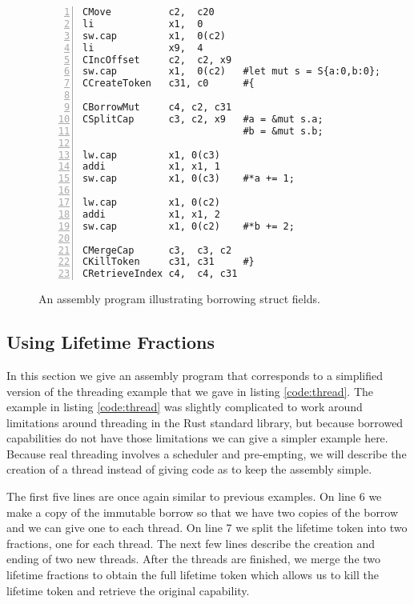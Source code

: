\begin{figure}[h]
\begin{lstlisting}[style=custASM, numbers = left ,xleftmargin=1.5em]
CMove          c2,  c20
li             x1,  0
sw.cap         x1,  0(c2)
li             x9,  4
CIncOffset     c2,  c2, x9
sw.cap         x1,  0(c2)   #let mut s = S{a:0,b:0};
CCreateToken   c31, c0      #{

CBorrowMut     c4, c2, c31
CSplitCap      c3, c2, x9   #a = &mut s.a;
                            #b = &mut s.b;

lw.cap         x1, 0(c3)
addi           x1, x1, 1
sw.cap         x1, 0(c3)    #*a += 1;

lw.cap         x1, 0(c2)
addi           x1, x1, 2
sw.cap         x1, 0(c2)    #*b += 2;

CMergeCap      c3,  c3, c2
CKillToken     c31, c31     #}
CRetrieveIndex c4,  c4, c31
\end{lstlisting}
\caption{An assembly program illustrating borrowing struct fields.}
\label{fig:asmstructexample}
\end{figure}

\subsection{Using Lifetime Fractions}
In this section we give an assembly program that corresponds to a simplified version of the threading example that we gave in listing \ref{code:thread}.
The example in listing \ref{code:thread} was slightly complicated to work around limitations around threading in the Rust standard library, but because borrowed capabilities do not have those limitations we can give a simpler example here.
Because real threading involves a scheduler and pre-empting, we will describe the creation of a thread instead of giving code as to keep the assembly simple.

The first five lines are once again similar to previous examples.
On line 6 we make a copy of the immutable borrow so that we have two copies of the borrow and we can give one to each thread.
On line 7 we split the lifetime token into two fractions, one for each thread.
The next few lines describe the creation and ending of two new threads.
After the threads are finished, we merge the two lifetime fractions to obtain the full lifetime token which allows us to kill the lifetime token and retrieve the original capability.

